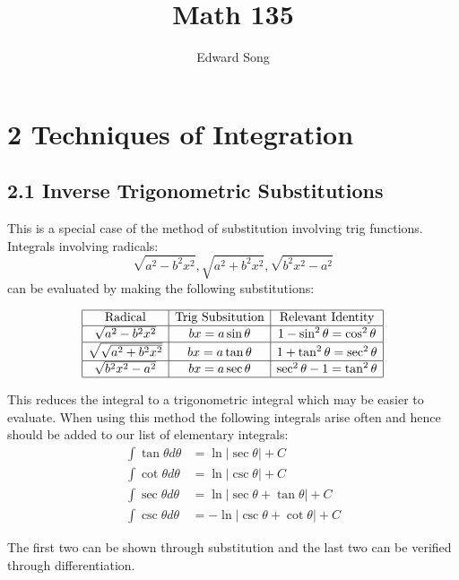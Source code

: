 \documentclass[11pt]{article}
\title{Math 135}
\author{Edward Song}
\theoremstyle{plain}
\theoremstyle{remark}
\theoremstyle{plain}
\begin{document}
\section*{2 Techniques of Integration}


   

\subsection*{2.1 Inverse Trigonometric Substitutions}

This is a special case of the method of substitution involving trig functions. Integrals involving radicals:
\[\sqrt{a^2-b^2x^2},\sqrt{a^2+b^2x^2},\sqrt{b^2x^2-a^2}\] can be evaluated by making the 
following substitutions:

\begin{align*}
    \begin{array}{|c|c|c|} \hline
        \text{Radical} & \text{Trig Subsitution} &\text{Relevant Identity}  \\\hline
        \sqrt{a^2-b^2x^2} & bx=a\sin\theta &1-\sin^2\theta=\cos^2\theta \\\hline
        \sqrt{\sqrt{a^2+b^2x^2}} & bx=a\tan\theta &1+\tan^2\theta=\sec^2\theta \\\hline
        \sqrt{b^2x^2-a^2} & bx=a\sec\theta &\sec^2\theta-1=\tan^2\theta \\\hline
    \end{array}
\end{align*}

This reduces the integral to a trigonometric integral which may be easier to evaluate. When using this method
the following integrals arise often and hence should be added to our list of elementary integrals:
\begin{align*}
    \int\tan\theta d\theta &= \ln |\sec\theta |+C\\
    \int\cot\theta d\theta &=\ln |\csc\theta | + C\\
    \int\sec\theta d\theta &= \ln |\sec\theta+\tan\theta |+C\\
    \int\csc\theta d\theta &= -\ln |\csc\theta +\cot\theta|+C
\end{align*}

The first two can be shown through substitution and the last two can be verified through differentiation.
\end{document}
